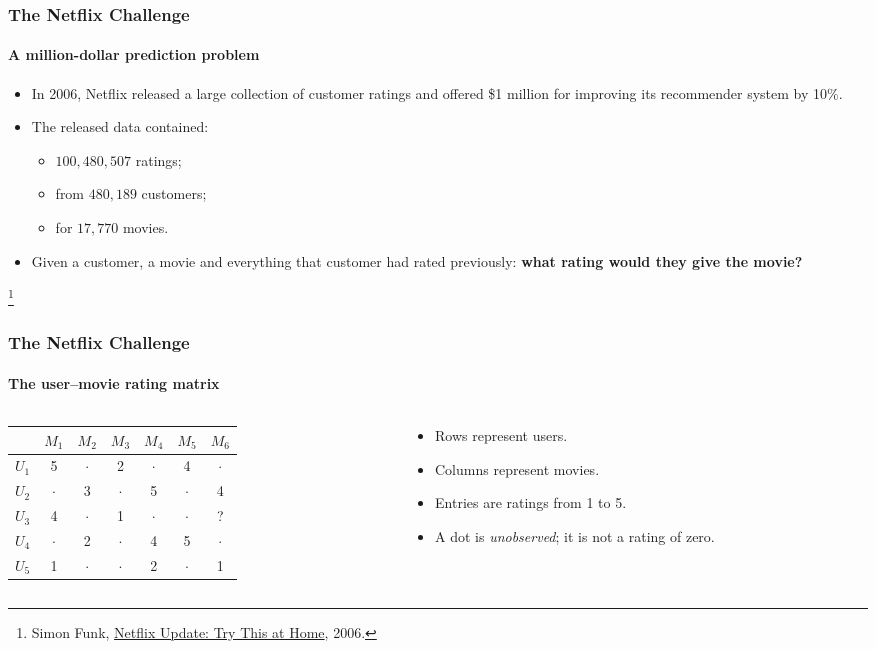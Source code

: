 \documentclass[]{article}
\newcommand\blfootnote[1]{%
  \begingroup
  \renewcommand\thefootnote{}\footnote{#1}%
  \addtocounter{footnote}{-1}%
  \endgroup
}
\begin{document}
\begin{frame}
\frametitle{The Netflix Challenge}
\framesubtitle{A million-dollar prediction problem}
\begin{itemize}
	\item<+-> In 2006, Netflix released a large collection of customer ratings and offered \$1 million for improving its recommender system by 10\%.
	\item<+-> The released data contained:
	\begin{itemize}
		\item<+-> $100{,}480{,}507$ ratings;
		\item<+-> from $480{,}189$ customers;
		\item<+-> for $17{,}770$ movies.
	\end{itemize}
	\item<+-> Given a customer, a movie and everything that customer had rated previously: \textbf{what rating would they give the movie?}
\end{itemize}
\blfootnote{\tiny Simon Funk, \href{https://sifter.org/~simon/journal/20061211.html}{Netflix Update: Try This at Home}, 2006.}
\end{frame}

\begin{frame}
\frametitle{The Netflix Challenge}
\framesubtitle{The user--movie rating matrix}
\begin{columns}
\begin{column}{0.58\textwidth}
\centering
\renewcommand{\arraystretch}{1.3}
\begin{tabular}{c|cccccc}
 & $M_1$ & $M_2$ & $M_3$ & $M_4$ & $M_5$ & $M_6$ \\ \hline
$U_1$ & 5 & $\cdot$ & 2 & $\cdot$ & 4 & $\cdot$ \\
$U_2$ & $\cdot$ & 3 & $\cdot$ & 5 & $\cdot$ & 4 \\
$U_3$ & 4 & $\cdot$ & 1 & $\cdot$ & $\cdot$ & ? \\
$U_4$ & $\cdot$ & 2 & $\cdot$ & 4 & 5 & $\cdot$ \\
$U_5$ & 1 & $\cdot$ & $\cdot$ & 2 & $\cdot$ & 1
\end{tabular}
\end{column}
\begin{column}{0.42\textwidth}
\begin{itemize}
	\item Rows represent users.
	\item Columns represent movies.
	\item<2-> Entries are ratings from 1 to 5.
	\item<3-> A dot is \emph{unobserved}; it is not a rating of zero.
\end{itemize}
\end{column}
\end{columns}
\vspace{0.5em}
\end{frame}
\end{document}
